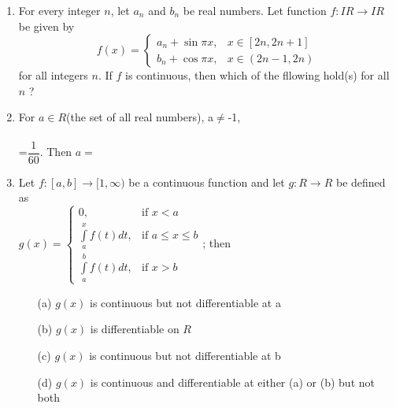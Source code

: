 \documentclass[journal,12pt,twocolumn]{IEEEtran}
\begin{document}
\begin{enumerate}
\item For every integer $n$, let $a_n$ and $b_n$ be real numbers. Let function $f:IR \to IR$ be given by
$$f(x)=\begin{cases}
a_n+\sin\pi x, & \text{$x \in [2n, 2n+1]$}\\
b_n+\cos\pi x, & \text{$x \in (2n-1, 2n)$}
\end{cases}$$
for all integers $n$. If $f$ is continuous, then which of the fllowing hold(s) for all $n$ ?
\begin{itemize}
\end{itemize}

\item For $a \in R$(the set of all real numbers), a$\neq$-1,\\
\\=$\dfrac{1}{60}$. Then $a=$
\begin{itemize}
\end{itemize}

\item Let $f:[a,b] \to [1,\infty)$ be a continuous function and let $g:R \to R$ be defined as\\
$g(x)= \begin{cases}
0, & \text{if $x<a$}\\
\int\limits_a^xf(t)dt, & \text{if $a\leq x\leq b$}\\
\int\limits_a^bf(t)dt, & \text{if $x>b$} 
\end{cases}$; then
\begin{itemize}
\item[(a)] $g(x)$ is continuous but not differentiable at a
\item[(b)] $g(x)$ is differentiable on $R$
\item[(c)] $g(x)$ is continuous but not differentiable at b
\item[(d)] $g(x)$ is continuous and differentiable at either (a) or (b) but not both
\end{itemize}


\end{enumerate}
\end{document}
